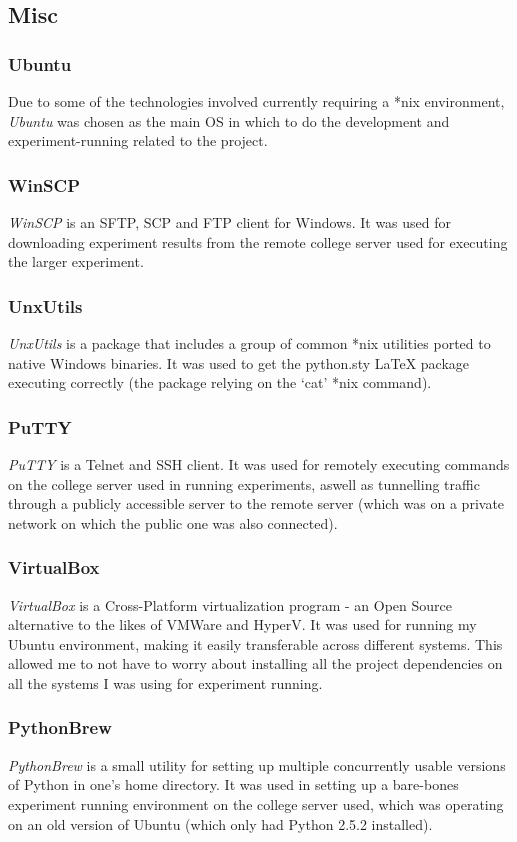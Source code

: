 \documentclass[a4paper,11pt]{report}
\begin{document}
\subsection{Misc}

\subsubsection*{Ubuntu}
Due to some of the technologies involved currently requiring a *nix environment, \emph{Ubuntu} \citep{prog:ubuntu} was chosen as the main OS in which to do the development and experiment-running related to the project.

\subsubsection*{WinSCP}
\emph{WinSCP} \citep{prog:winscp} is an SFTP, SCP and FTP client for Windows. It was used for downloading experiment results from the remote college server used for executing the larger experiment.

\subsubsection*{UnxUtils}
\emph{UnxUtils} \citep{prog:unxutils} is a package that includes a group of common *nix utilities ported to native Windows binaries. It was used to get the python.sty \LaTeX{} package executing correctly (the package relying on the `cat' *nix command).

\subsubsection*{PuTTY}
\emph{PuTTY} \citep{prog:putty} is a Telnet and SSH client. It was used for remotely executing commands on the college server used in running experiments, aswell as tunnelling traffic through a publicly accessible server to the remote server (which was on a private network on which the public one was also connected).

\subsubsection*{VirtualBox}
\emph{VirtualBox} \citep{prog:virtualbox} is a Cross-Platform virtualization program - an Open Source alternative to the likes of VMWare and HyperV. It was used for running my Ubuntu environment, making it easily transferable across different systems. This allowed me to not have to worry about installing all the project dependencies on all the systems I was using for experiment running.

\subsubsection*{PythonBrew}
\emph{PythonBrew} \citep{prog:pythonbrew} is a small utility for setting up multiple concurrently usable versions of Python in one's home directory. It was used in setting up a bare-bones experiment running environment on the college server used, which was operating on an old version of Ubuntu (which only had Python 2.5.2 installed).



\end{document}
